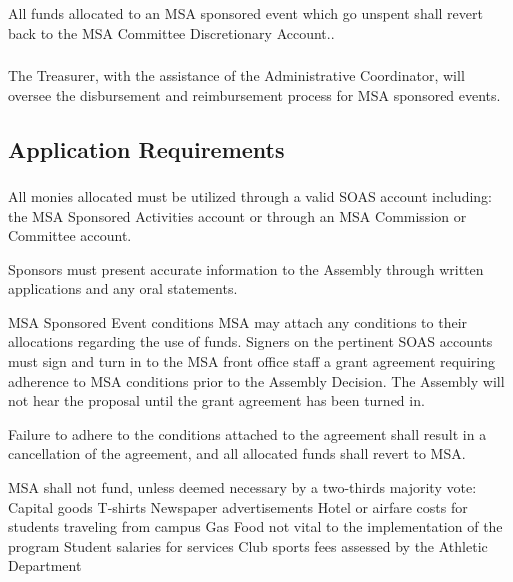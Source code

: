 \subsubsection{}
All funds allocated to an MSA sponsored event which go unspent shall revert back to the MSA Committee Discretionary Account..
\subsubsection{}
The Treasurer, with the assistance of the Administrative Coordinator, will oversee the disbursement and reimbursement process for MSA sponsored events.

\subsection{Application Requirements}
\subsubsection{}
All monies allocated must be utilized through a valid SOAS account including: the MSA Sponsored Activities account or through an MSA Commission or Committee account.

\subsubsubsection{}
Sponsors must present accurate information to the Assembly through written applications and any oral statements.

\subsubsubsection{}
MSA Sponsored Event conditions
\subsubsubsubsection{}
MSA may attach any conditions to their allocations regarding the use of funds.
\subsubsubsubsection{}
Signers on the pertinent SOAS accounts must sign and turn in to the MSA front office staff a grant agreement requiring adherence to MSA conditions prior to the Assembly Decision.
\subsubsubsubsubsection{}
The Assembly will not hear the proposal until the grant agreement has been turned in. 

\subsubsubsubsection{}
Failure to adhere to the conditions attached to the agreement shall result in a cancellation of the agreement, and all allocated funds shall revert to MSA. 

\subsubsubsubsection{}
MSA shall not fund, unless deemed necessary by a two-thirds majority vote:
\subsubsubsubsubsection{}
Capital goods
\subsubsubsubsubsection{}
T-shirts
\subsubsubsubsubsection{}
Newspaper advertisements
\subsubsubsubsubsection{}
Hotel or airfare costs for students traveling from campus
\subsubsubsubsubsection{}
Gas
\subsubsubsubsubsection{}
Food not vital to the implementation of the program
\subsubsubsubsubsection{}
Student salaries for services
\subsubsubsubsubsection{}
Club sports fees assessed by the Athletic Department


